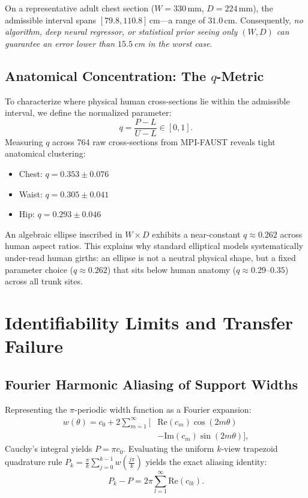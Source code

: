 \documentclass[journal]{IEEEtran}
\begin{document}
On a representative adult chest section ($W=330$\,mm, $D=224$\,mm), the admissible interval spans $[79.8, 110.8]$\,cm---a range of $31.0$\,cm. Consequently, \textit{no algorithm, deep neural regressor, or statistical prior seeing only $(W, D)$ can guarantee an error lower than $15.5$\,cm in the worst case}.

\subsection{Anatomical Concentration: The $q$-Metric}
To characterize where physical human cross-sections lie within the admissible interval, we define the normalized parameter:
\begin{equation}
q = \frac{P - L}{U - L} \in [0, 1].
\label{eq:q_metric}
\end{equation}
Measuring $q$ across 764 raw cross-sections from MPI-FAUST \cite{bogo2014faust} reveals tight anatomical clustering:
\begin{itemize}
    \item Chest: $q = 0.353 \pm 0.076$
    \item Waist: $q = 0.305 \pm 0.041$
    \item Hip: $q = 0.293 \pm 0.046$
\end{itemize}

An algebraic ellipse inscribed in $W \times D$ exhibits a near-constant $q \approx 0.262$ across human aspect ratios. This explains why standard elliptical models systematically under-read human girths: an ellipse is not a neutral physical shape, but a fixed parameter choice ($q \approx 0.262$) that sits below human anatomy ($q \approx 0.29$--$0.35$) across all trunk sites.

\section{Identifiability Limits and Transfer Failure}
\label{sec:identifiability}

\subsection{Fourier Harmonic Aliasing of Support Widths}
Representing the $\pi$-periodic width function as a Fourier expansion:
\begin{equation}
\begin{aligned}
w(\theta) = c_0 + 2\sum_{m=1}^\infty \Big[ &\text{Re}(c_m)\cos(2m\theta) \\
&- \text{Im}(c_m)\sin(2m\theta) \Big],
\end{aligned}
\label{eq:fourier_w}
\end{equation}
Cauchy's integral yields $P = \pi c_0$. Evaluating the uniform $k$-view trapezoid quadrature rule $P_k = \frac{\pi}{k}\sum_{j=0}^{k-1} w\left(\frac{j\pi}{k}\right)$ yields the exact aliasing identity:
\begin{equation}
P_k - P = 2\pi \sum_{l=1}^\infty \text{Re}(c_{lk}).
\label{eq:aliasing_general}
\end{equation}
\end{document}
